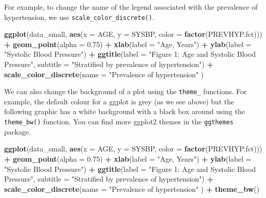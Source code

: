 \documentclass[
]{article}
\newenvironment{Shaded}{\begin{snugshade}}{\end{snugshade}}
\newcommand{\DataTypeTok}[1]{\textcolor[rgb]{0.13,0.29,0.53}{#1}}
\newcommand{\FloatTok}[1]{\textcolor[rgb]{0.00,0.00,0.81}{#1}}
\newcommand{\KeywordTok}[1]{\textcolor[rgb]{0.13,0.29,0.53}{\textbf{#1}}}
\newcommand{\NormalTok}[1]{#1}
\newcommand{\OperatorTok}[1]{\textcolor[rgb]{0.81,0.36,0.00}{\textbf{#1}}}
\newcommand{\StringTok}[1]{\textcolor[rgb]{0.31,0.60,0.02}{#1}}
\begin{document}
For example, to change the name of the legend associated with the
prevalence of hypertension, we use \texttt{scale\_color\_discrete()}.

\begin{Shaded}
\begin{Highlighting}[]
\KeywordTok{ggplot}\NormalTok{(data_small, }
      \KeywordTok{aes}\NormalTok{(}\DataTypeTok{x =}\NormalTok{ AGE, }\DataTypeTok{y =}\NormalTok{ SYSBP, }\DataTypeTok{color =} \KeywordTok{factor}\NormalTok{(PREVHYP.fct))) }\OperatorTok{+}
\StringTok{  }\KeywordTok{geom_point}\NormalTok{(}\DataTypeTok{alpha =} \FloatTok{0.75}\NormalTok{) }\OperatorTok{+}
\StringTok{  }\KeywordTok{xlab}\NormalTok{(}\DataTypeTok{label =} \StringTok{"Age, Years"}\NormalTok{) }\OperatorTok{+}\StringTok{ }
\StringTok{  }\KeywordTok{ylab}\NormalTok{(}\DataTypeTok{label =} \StringTok{"Systolic Blood Pressure"}\NormalTok{) }\OperatorTok{+}
\StringTok{  }\KeywordTok{ggtitle}\NormalTok{(}\DataTypeTok{label =} \StringTok{"Figure 1: Age and Systolic Blood Pressure"}\NormalTok{, }
          \DataTypeTok{subtitle =} \StringTok{"Stratified by prevalence of hypertension"}\NormalTok{) }\OperatorTok{+}\StringTok{ }
\StringTok{  }\KeywordTok{scale_color_discrete}\NormalTok{(}\DataTypeTok{name =} \StringTok{"Prevalence of hypertension"}\NormalTok{ )}
\end{Highlighting}
\end{Shaded}

We can also change the background of a plot using the \texttt{theme\_}
functions. For example, the default colour for a ggplot is grey (as we
see above) but the following graphic has a white background with a black
box around using the \texttt{theme\_bw()} function. You can find more
ggplot2 themes in the \texttt{ggthemes} package.

\begin{Shaded}
\begin{Highlighting}[]
\KeywordTok{ggplot}\NormalTok{(data_small, }
      \KeywordTok{aes}\NormalTok{(}\DataTypeTok{x =}\NormalTok{ AGE, }\DataTypeTok{y =}\NormalTok{ SYSBP, }\DataTypeTok{color =} \KeywordTok{factor}\NormalTok{(PREVHYP.fct))) }\OperatorTok{+}
\StringTok{  }\KeywordTok{geom_point}\NormalTok{(}\DataTypeTok{alpha =} \FloatTok{0.75}\NormalTok{) }\OperatorTok{+}
\StringTok{  }\KeywordTok{xlab}\NormalTok{(}\DataTypeTok{label =} \StringTok{"Age, Years"}\NormalTok{) }\OperatorTok{+}\StringTok{ }
\StringTok{  }\KeywordTok{ylab}\NormalTok{(}\DataTypeTok{label =} \StringTok{"Systolic Blood Pressure"}\NormalTok{) }\OperatorTok{+}
\StringTok{  }\KeywordTok{ggtitle}\NormalTok{(}\DataTypeTok{label =} \StringTok{"Figure 1: Age and Systolic Blood Pressure"}\NormalTok{, }
          \DataTypeTok{subtitle =} \StringTok{"Stratified by prevalence of hypertension"}\NormalTok{) }\OperatorTok{+}\StringTok{ }
\StringTok{  }\KeywordTok{scale_color_discrete}\NormalTok{(}\DataTypeTok{name =} \StringTok{"Prevalence of hypertension"}\NormalTok{ ) }\OperatorTok{+}\StringTok{ }
\StringTok{  }\KeywordTok{theme_bw}\NormalTok{()}
\end{Highlighting}
\end{Shaded}
\end{document}

